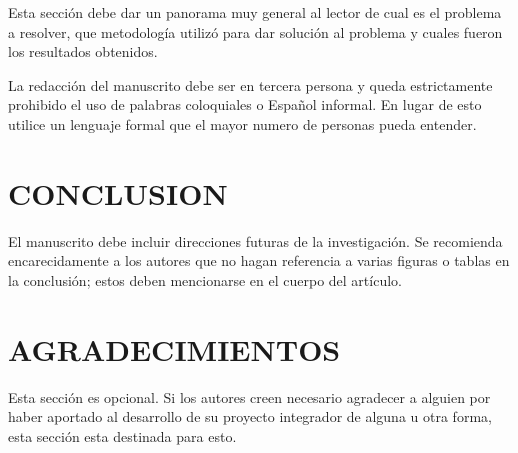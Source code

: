 \documentclass{IEEEcsmag}
\begin{document}
Esta sección debe dar un panorama muy general al lector de cual es el problema a resolver, que metodología utilizó para dar solución al problema y cuales fueron los resultados obtenidos. 

La redacción del manuscrito debe ser en tercera persona y queda estrictamente prohibido el uso de palabras coloquiales o Español informal. En lugar de esto utilice un lenguaje formal que el mayor numero de personas pueda entender.
\clearpage


\clearpage


\clearpage


\clearpage


\clearpage


\clearpage


\clearpage


\section{CONCLUSION}
El manuscrito debe incluir direcciones futuras de la investigación. Se recomienda encarecidamente a los autores que no hagan referencia a varias figuras o tablas en la conclusión; estos deben mencionarse en el cuerpo del artículo.
\vspace*{-8pt}


\section{AGRADECIMIENTOS}
Esta sección es opcional. Si los autores creen necesario agradecer a alguien por haber aportado al desarrollo de su proyecto integrador de alguna u otra forma, esta sección esta destinada para esto.


\def\refname{REFERENCES}
\end{document}
